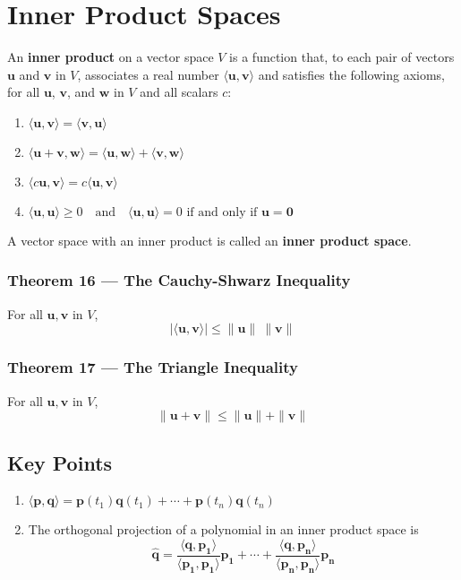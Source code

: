 \documentclass{article}
\begin{document}
\section*{Inner Product Spaces}

An \textbf{inner product} on a vector space $V$ is a function that, to each pair of vectors
$\mathbf{u}$ and $\mathbf{v}$ in $V$, associates a real number
$\langle\mathbf{u},\mathbf{v}\rangle$ and satisfies the following axioms, for all $\mathbf{u}$,
$\mathbf{v}$, and $\mathbf{w}$ in $V$ and all scalars $c$:
\begin{enumerate}
    \item $\langle\mathbf{u},\mathbf{v}\rangle=\langle\mathbf{v},\mathbf{u}\rangle$
    \item $\langle\mathbf{u+v},\mathbf{w}\rangle=\langle\mathbf{u},\mathbf{w}\rangle+\langle
    \mathbf{v},\mathbf{w}\rangle$
    \item $\langle c\mathbf{u},\mathbf{v}\rangle=c\langle\mathbf{u},\mathbf{v}\rangle$
    \item $\langle\mathbf{u},\mathbf{u}\rangle\geq 0\quad\text{and}\quad\langle\mathbf{u},
    \mathbf{u}\rangle=0\text{ if and only if }\mathbf{u=0}$
\end{enumerate}

A vector space with an inner product is called an \textbf{inner product space}.

\subsubsection*{Theorem 16 --- The Cauchy-Shwarz Inequality}
For all $\mathbf{u}, \mathbf{v}$ in $V$,
\[|\langle\mathbf{u},\mathbf{v}\rangle |\leq\|\mathbf{u}\|\:\|\mathbf{v}\|\]

\subsubsection*{Theorem 17 --- The Triangle Inequality}
For all $\mathbf{u}, \mathbf{v}$ in $V$,
\[\|\mathbf{u} + \mathbf{v}\| \leq \|\mathbf{u}\| + \|\mathbf{v}\|\]

\subsection*{Key Points}
\begin{enumerate}
    \item $\langle\mathbf{p},\mathbf{q}\rangle=\mathbf{p}(t_1)\mathbf{q}(t_1) + \cdots +
    \mathbf{p}(t_n)\mathbf{q}(t_n)$
    \item The orthogonal projection of a polynomial in an inner product space is 
    \[\mathbf{\hat{q}}=\frac{\langle\mathbf{q},\mathbf{p_1}\rangle}{\langle\mathbf{p_1},
    \mathbf{p_1}\rangle} \mathbf{p_1} + \cdots + \frac{\langle\mathbf{q},\mathbf{p_n}\rangle}
    {\langle\mathbf{p_n}, \mathbf{p_n}\rangle} \mathbf{p_n}\]
\end{enumerate}
\end{document}

